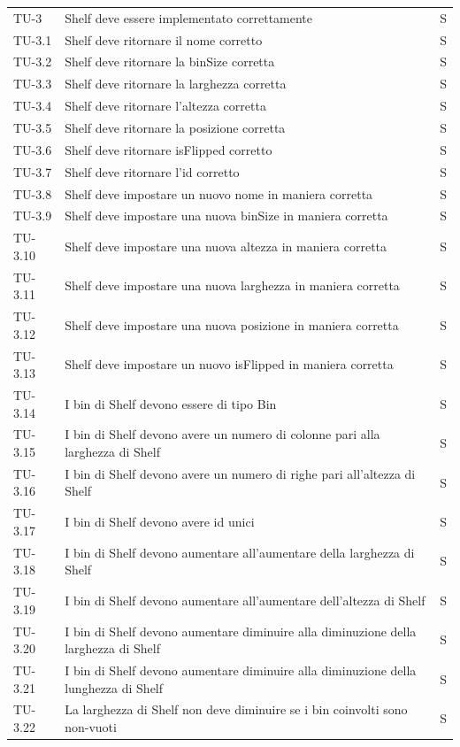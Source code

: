 \begin{xltabular}{0.9\textwidth}{X | p{0.6\textwidth} | p{0.1\textwidth} }
    TU-3 & Shelf deve essere implementato correttamente & S\\
    TU-3.1 & Shelf deve ritornare il nome corretto & S\\
    TU-3.2 & Shelf deve ritornare la binSize corretta & S\\
    TU-3.3 & Shelf deve ritornare la larghezza corretta & S\\
    TU-3.4 & Shelf deve ritornare l'altezza corretta & S\\
    TU-3.5 & Shelf deve ritornare la posizione corretta & S\\
    TU-3.6 & Shelf deve ritornare isFlipped corretto & S\\
    TU-3.7 & Shelf deve ritornare l'id corretto & S\\
    TU-3.8 & Shelf deve impostare un nuovo nome in maniera corretta & S\\
    TU-3.9 & Shelf deve impostare una nuova binSize in maniera corretta & S\\
    TU-3.10 & Shelf deve impostare una nuova altezza in maniera corretta & S\\
    TU-3.11 & Shelf deve impostare una nuova larghezza in maniera corretta & S\\
    TU-3.12 & Shelf deve impostare una nuova posizione in maniera corretta & S\\
    TU-3.13 & Shelf deve impostare un nuovo isFlipped in maniera corretta & S\\
    TU-3.14 & I bin di Shelf devono essere di tipo Bin & S\\
    TU-3.15 & I bin di Shelf devono avere un numero di colonne pari alla larghezza di Shelf & S\\
    TU-3.16 & I bin di Shelf devono avere un numero di righe pari all'altezza di Shelf & S\\
    TU-3.17 & I bin di Shelf devono avere id unici & S\\
    TU-3.18 & I bin di Shelf devono aumentare all'aumentare della larghezza di Shelf & S\\
    TU-3.19 & I bin di Shelf devono aumentare all'aumentare dell'altezza di Shelf & S\\
    TU-3.20 & I bin di Shelf devono aumentare diminuire alla diminuzione della larghezza di Shelf & S\\
    TU-3.21 & I bin di Shelf devono aumentare diminuire alla diminuzione della lunghezza di Shelf & S\\
    TU-3.22 & La larghezza di Shelf non deve diminuire se i bin coinvolti sono non-vuoti & S\\

\end{xltabular}
